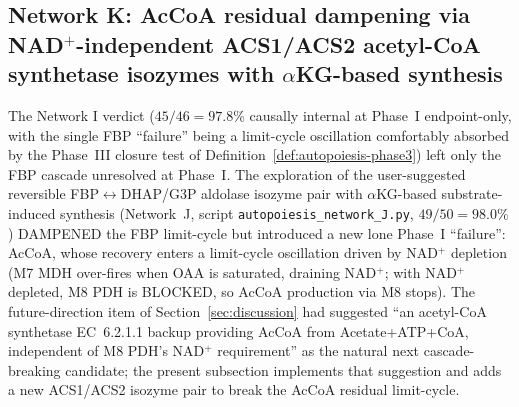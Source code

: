 \documentclass[11pt,a4paper]{article}
\theoremstyle{plain}
\theoremstyle{definition}
\theoremstyle{remark}
\begin{document}
\subsection{Network K: AcCoA residual dampening via NAD$^+$-independent
ACS1/ACS2 acetyl-CoA synthetase isozymes with $\alpha$KG-based synthesis}
\label{sec:autopoiesis-network-K}

The Network I verdict ($45/46 = 97.8\%$ causally internal at Phase~I
endpoint-only, with the single FBP ``failure'' being a limit-cycle
oscillation comfortably absorbed by the Phase~III closure test of
Definition~\ref{def:autopoiesis-phase3}) left only the FBP cascade
unresolved at Phase~I. The exploration of the user-suggested reversible
FBP$\leftrightarrow$DHAP/G3P aldolase isozyme pair with
$\alpha$KG-based substrate-induced synthesis (Network~J,
script \texttt{autopoiesis\_network\_J.py}, $49/50 = 98.0\%$)
DAMPENED the FBP limit-cycle but introduced a new lone Phase~I
``failure'': AcCoA, whose recovery enters a limit-cycle oscillation
driven by NAD$^+$ depletion (M7 MDH over-fires when OAA is saturated,
draining NAD$^+$; with NAD$^+$ depleted, M8 PDH is BLOCKED, so AcCoA
production via M8 stops). The future-direction item of
Section~\ref{sec:discussion} had suggested ``an acetyl-CoA synthetase
EC~6.2.1.1 backup providing AcCoA from Acetate+ATP+CoA, independent
of M8 PDH's NAD$^+$ requirement'' as the natural next
cascade-breaking candidate; the present subsection implements that
suggestion and adds a new ACS1/ACS2 isozyme pair to break the AcCoA
residual limit-cycle.
\end{document}

